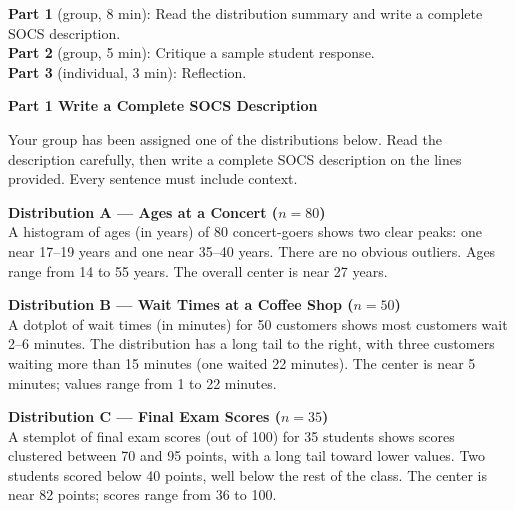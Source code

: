 \documentclass[10pt]{article}
\begin{document}
\namepartnerperiod

\vspace{0.1in}

\begin{tcolorbox}[colback=sky, colframe=navy, boxrule=0.8pt, arc=2mm,
    left=3mm, right=3mm, top=2mm, bottom=2mm]
\small
\textbf{Part 1} (group, 8 min): Read the distribution summary and write a
complete SOCS description.\\[4pt]
\textbf{Part 2} (group, 5 min): Critique a sample student response.\\[4pt]
\textbf{Part 3} (individual, 3 min): Reflection.
\end{tcolorbox}

\vspace{0.14in}

{\large\bfseries\color{navy} Part 1 \quad Write a Complete SOCS Description}

\vspace{0.1in}

\noindent\small Your group has been assigned one of the distributions below.
Read the description carefully, then write a complete SOCS description on the
lines provided. Every sentence must include context.

\vspace{0.1in}

\begin{tcolorbox}[colback=white, colframe=navy, boxrule=0.8pt, arc=2mm,
    left=3mm, right=3mm, top=2mm, bottom=2mm]
\small
\textbf{Distribution A --- Ages at a Concert ($n = 80$)}\\
A histogram of ages (in years) of 80 concert-goers shows two clear peaks:
one near 17--19 years and one near 35--40 years. There are no obvious outliers.
Ages range from 14 to 55 years. The overall center is near 27 years.

\vspace{6pt}
\textbf{Distribution B --- Wait Times at a Coffee Shop ($n = 50$)}\\
A dotplot of wait times (in minutes) for 50 customers shows most customers
wait 2--6 minutes. The distribution has a long tail to the right, with three
customers waiting more than 15 minutes (one waited 22 minutes). The center
is near 5 minutes; values range from 1 to 22 minutes.

\vspace{6pt}
\textbf{Distribution C --- Final Exam Scores ($n = 35$)}\\
A stemplot of final exam scores (out of 100) for 35 students shows scores
clustered between 70 and 95 points, with a long tail toward lower values.
Two students scored below 40 points, well below the rest of the class.
The center is near 82 points; scores range from 36 to 100.
\end{tcolorbox}
\end{document}
